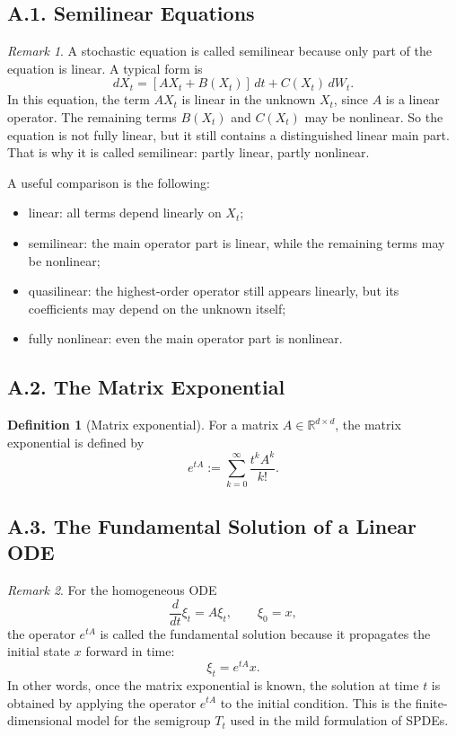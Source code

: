 \documentclass[11pt]{article}
\theoremstyle{definition}
\newtheorem{definition}{Definition}
\theoremstyle{remark}
\newtheorem{remark}{Remark}
\begin{document}
\subsection*{A.1. Semilinear Equations}
\begin{remark}
A stochastic equation is called semilinear because only part of the equation is linear. A typical form is
\[
dX_t=[AX_t+B(X_t)]\,dt+C(X_t)\,dW_t.
\]
In this equation, the term \(AX_t\) is linear in the unknown \(X_t\), since \(A\) is a linear operator. The remaining terms \(B(X_t)\) and \(C(X_t)\) may be nonlinear. So the equation is not fully linear, but it still contains a distinguished linear main part. That is why it is called semilinear: partly linear, partly nonlinear.

A useful comparison is the following:
\begin{itemize}
\item linear: all terms depend linearly on \(X_t\);
\item semilinear: the main operator part is linear, while the remaining terms may be nonlinear;
\item quasilinear: the highest-order operator still appears linearly, but its coefficients may depend on the unknown itself;
\item fully nonlinear: even the main operator part is nonlinear.
\end{itemize}
\end{remark}

\subsection*{A.2. The Matrix Exponential}
\begin{definition}[Matrix exponential]
For a matrix \(A\in\mathbb R^{d\times d}\), the matrix exponential is defined by
\[
e^{tA}
:=
\sum_{k=0}^{\infty}\frac{t^kA^k}{k!}.
\]
\end{definition}

\subsection*{A.3. The Fundamental Solution of a Linear ODE}
\begin{remark}
For the homogeneous ODE
\[
\frac{d}{dt}\xi_t=A\xi_t,
\qquad
\xi_0=x,
\]
the operator \(e^{tA}\) is called the fundamental solution because it propagates the initial state \(x\) forward in time:
\[
\xi_t=e^{tA}x.
\]
In other words, once the matrix exponential is known, the solution at time \(t\) is obtained by applying the operator \(e^{tA}\) to the initial condition. This is the finite-dimensional model for the semigroup \(T_t\) used in the mild formulation of SPDEs.
\end{remark}
\end{document}
